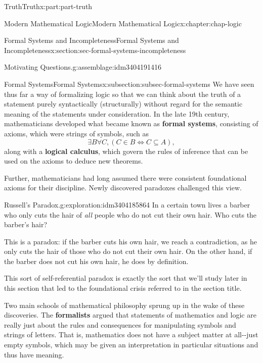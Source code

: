\documentclass[oneside,10pt,]{book}
\newcommand{\terminology}[1]{\textbf{#1}}
\numberwithin{equation}{section}
\begin{document}
\begin{partptx}{Truth}{}{Truth}{}{}{x:part:part-truth}
\begin{chapterptx}{Modern Mathematical Logic}{}{Modern Mathematical Logic}{}{}{x:chapter:chap-logic}
\begin{sectionptx}{Formal Systems and Incompleteness}{}{Formal Systems and Incompleteness}{}{}{x:section:sec-formal-systems-incompleteness}
\begin{assemblage}{Motivating Questions.}{g:assemblage:idm3404191416}
%
\end{assemblage}
%
%
\typeout{************************************************}
\typeout{************************************************}
%
\begin{subsectionptx}{Formal Systems}{}{Formal Systems}{}{}{x:subsection:subsec-formal-systems}
We have seen thus far a way of formalizing logic so that we can think about the truth of a statement purely syntactically (structurally) without regard for the semantic meaning of the statements under consideration. In the late 19th century, mathematicians developed what became known as \terminology{formal systems}, consisting of axioms, which were strings of symbols, such as%
\begin{equation*}
\exists B \forall C, (C\in B \Leftrightarrow C\subseteq A),
\end{equation*}
along with a \terminology{logical calculus}, which govern the rules of inference that can be used on the axioms to deduce new theorems.%
\par
Further, mathematicians had long assumed there were consistent foundational axioms for their discipline. Newly discovered paradoxes challenged this view.%
\begin{exploration}{Russell's Paradox.}{g:exploration:idm3404185864}%
In a certain town lives a barber who only cuts the hair of \emph{all} people who do not cut their own hair. Who cuts the barber's hair?%
\par\smallskip%
\noindent\hypertarget{g:solution:idm3404184600}{}This is a paradox: if the barber cuts his own hair, we reach a contradiction, as he only cuts the hair of those who do not cut their own hair. On the other hand, if the barber does not cut his own hair, he does by definition.%
\par
This sort of self-referential paradox is exactly the sort that we'll study later in this section that led to the foundational crisis referred to in the section title.%
\end{exploration}%
Two main schools of mathematical philosophy sprung up in the wake of these discoveries. The \terminology{formalists} argued that statements of mathematics and logic are really just about the rules and consequences for manipulating symbols and strings of letters. That is, mathematics does not have a subject matter at all-{}-{}just empty symbols, which may be given an interpretation in particular situations and thus have meaning.%
\par

\end{subsectionptx}
\end{sectionptx}
\end{chapterptx}
\end{partptx}
\end{document}
